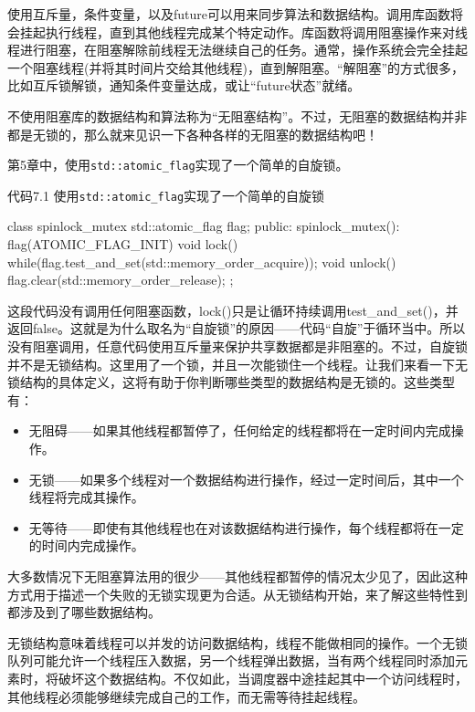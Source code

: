 
使用互斥量，条件变量，以及future可以用来同步算法和数据结构。调用库函数将会挂起执行线程，直到其他线程完成某个特定动作。库函数将调用阻塞操作来对线程进行阻塞，在阻塞解除前线程无法继续自己的任务。通常，操作系统会完全挂起一个阻塞线程(并将其时间片交给其他线程)，直到解阻塞。“解阻塞”的方式很多，比如互斥锁解锁，通知条件变量达成，或让“future状态”就绪。

不使用阻塞库的数据结构和算法称为“无阻塞结构”。不过，无阻塞的数据结构并非都是无锁的，那么就来见识一下各种各样的无阻塞的数据结构吧！


第5章中，使用\texttt{std::atomic\_flag}实现了一个简单的自旋锁。

代码7.1 使用\texttt{std::atomic\_flag}实现了一个简单的自旋锁

\begin{cpp}
class spinlock_mutex
{
  std::atomic_flag flag;
public:
  spinlock_mutex():
    flag(ATOMIC_FLAG_INIT)
  {}
  void lock()
  {
    while(flag.test_and_set(std::memory_order_acquire));
  }
  void unlock()
  {
    flag.clear(std::memory_order_release);
  }
};
\end{cpp}

这段代码没有调用任何阻塞函数，lock()只是让循环持续调用test\_and\_set()，并返回false。这就是为什么取名为“自旋锁”的原因——代码“自旋”于循环当中。所以没有阻塞调用，任意代码使用互斥量来保护共享数据都是非阻塞的。不过，自旋锁并不是无锁结构。这里用了一个锁，并且一次能锁住一个线程。让我们来看一下无锁结构的具体定义，这将有助于你判断哪些类型的数据结构是无锁的。这些类型有：

\begin{itemize}
    \item 无阻碍——如果其他线程都暂停了，任何给定的线程都将在一定时间内完成操作。
    \item 无锁——如果多个线程对一个数据结构进行操作，经过一定时间后，其中一个线程将完成其操作。
    \item 无等待——即使有其他线程也在对该数据结构进行操作，每个线程都将在一定的时间内完成操作。
\end{itemize}

大多数情况下无阻塞算法用的很少——其他线程都暂停的情况太少见了，因此这种方式用于描述一个失败的无锁实现更为合适。从无锁结构开始，来了解这些特性到都涉及到了哪些数据结构。


无锁结构意味着线程可以并发的访问数据结构，线程不能做相同的操作。一个无锁队列可能允许一个线程压入数据，另一个线程弹出数据，当有两个线程同时添加元素时，将破坏这个数据结构。不仅如此，当调度器中途挂起其中一个访问线程时，其他线程必须能够继续完成自己的工作，而无需等待挂起线程。

